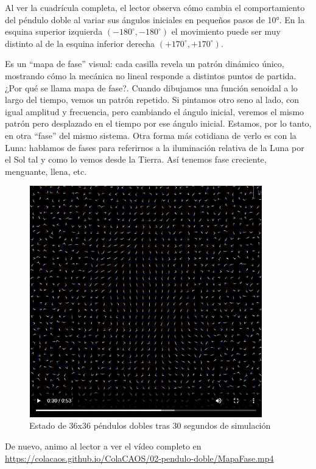 \documentclass[
  10pt,
  a4paper,
  DIV=11,
  numbers=noendperiod,
  open=any]{scrreprt}
\numberwithin{equation}{chapter}
\numberwithin{equation}{section}
\renewcommand{\[}{\begin{equation}}
\renewcommand{\]}{\end{equation}}
\begin{document}
Al ver la cuadrícula completa, el lector observa cómo cambia el
comportamiento del péndulo doble al variar sus ángulos iniciales en
pequeños pasos de 10°. En la esquina superior izquierda
\((-180^\circ,-180^\circ)\) el movimiento puede ser muy distinto al de
la esquina inferior derecha \((+170^\circ,+170^\circ)\).

Es un ``mapa de fase'' visual: cada casilla revela un patrón dinámico
único, mostrando cómo la mecánica no lineal responde a distintos puntos
de partida. ¿Por qué se llama mapa de fase?. Cuando dibujamos una
función senoidal a lo largo del tiempo, vemos un patrón repetido. Si
pintamos otro seno al lado, con igual amplitud y frecuencia, pero
cambiando el ángulo inicial, veremos el mismo patrón pero desplazado en
el tiempo por ese ángulo inicial. Estamos, por lo tanto, en otra
``fase'' del mismo sistema. Otra forma más cotidiana de verlo es con la
Luna: hablamos de fases para referirnos a la iluminación relativa de la
Luna por el Sol tal y como lo vemos desde la Tierra. Así tenemos fase
creciente, menguante, llena, etc.


\begin{figure}[h]
  \centering
  \includegraphics[width=0.9\textwidth]{02-pendulo-doble/mapafases1.png}
  \caption{Estado de 36x36 péndulos dobles tras 30 segundos de simulación}
\end{figure}


De nuevo, animo al lector a ver el vídeo completo en \url{https://colacaos.github.io/ColaCAOS/02-pendulo-doble/MapaFase.mp4}
\end{document}
